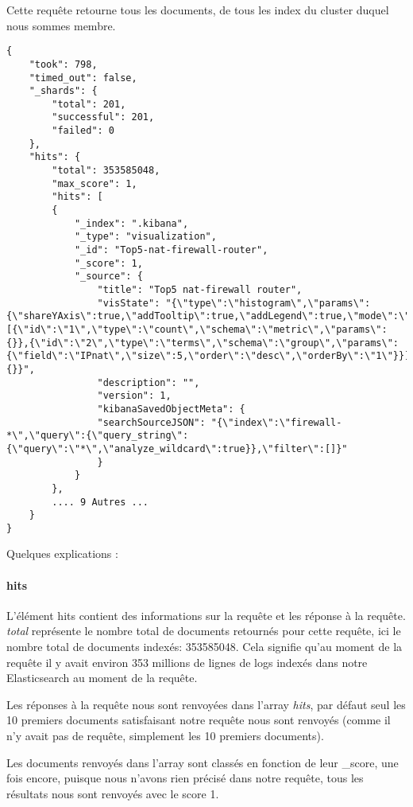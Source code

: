 Cette requête retourne tous les documents, de tous les index du cluster duquel nous
sommes membre.

\begin{lstlisting}[style=code,label={lst:APIsearchemptyexample2},caption={Réponse type à notre requête précédente}]
{
    "took": 798,
    "timed_out": false,
    "_shards": {
        "total": 201,
        "successful": 201,
        "failed": 0
    },
    "hits": {
        "total": 353585048,
        "max_score": 1,
        "hits": [
        {
            "_index": ".kibana",
            "_type": "visualization",
            "_id": "Top5-nat-firewall-router",
            "_score": 1,
            "_source": {
                "title": "Top5 nat-firewall router",
                "visState": "{\"type\":\"histogram\",\"params\":{\"shareYAxis\":true,\"addTooltip\":true,\"addLegend\":true,\"mode\":\"stacked\",\"defaultYExtents\":false},\"aggs\":[{\"id\":\"1\",\"type\":\"count\",\"schema\":\"metric\",\"params\":{}},{\"id\":\"2\",\"type\":\"terms\",\"schema\":\"group\",\"params\":{\"field\":\"IPnat\",\"size\":5,\"order\":\"desc\",\"orderBy\":\"1\"}}],\"listeners\":{}}",
                "description": "",
                "version": 1,
                "kibanaSavedObjectMeta": {
                "searchSourceJSON": "{\"index\":\"firewall-*\",\"query\":{\"query_string\":{\"query\":\"*\",\"analyze_wildcard\":true}},\"filter\":[]}"
                }
            }
        },
        .... 9 Autres ...
    }
}
\end{lstlisting}

Quelques explications :

\paragraph{hits}
L'élément hits contient des informations sur la requête et les réponse à la requête.
\textit{total} représente le nombre total de documents retournés pour cette requête, ici le 
nombre total de documents indexés: 353585048. 
Cela signifie qu'au moment de la requête il y avait environ 353 millions de lignes
de logs indexés dans notre Elasticsearch au moment de la requête.

Les réponses à la requête nous sont renvoyées dans l'array \textit{hits}, par défaut
seul les 10 premiers documents satisfaisant notre requête nous sont renvoyés 
(comme il n'y avait pas de requête, simplement les 10 premiers documents).

Les documents renvoyés dans l'array sont classés en fonction de leur \_score, une 
fois encore, puisque nous n'avons rien précisé dans notre requête, tous les résultats 
nous sont renvoyés avec le score 1.

